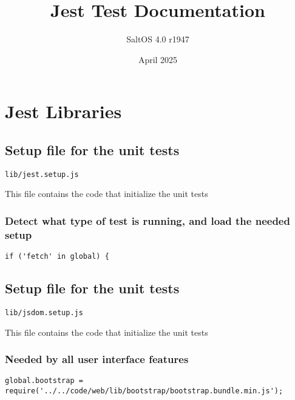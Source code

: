 \documentclass[a4paper]{article}
\title{Jest Test Documentation}
\author{SaltOS 4.0 r1947}
\begin{document}
\date{April 2025}
\maketitle
\clearpage

\tableofcontents
\clearpage


\hypertarget{toc1}{}
\section{Jest Libraries}

\hypertarget{toc2}{}
\subsection{Setup file for the unit tests}

\begin{lstlisting}
lib/jest.setup.js
\end{lstlisting}

This file contains the code that initialize the unit tests

\hypertarget{toc3}{}
\subsubsection{Detect what type of test is running, and load the needed setup}

\begin{lstlisting}
if ('fetch' in global) {
\end{lstlisting}

\hypertarget{toc4}{}
\subsection{Setup file for the unit tests}

\begin{lstlisting}
lib/jsdom.setup.js
\end{lstlisting}

This file contains the code that initialize the unit tests

\hypertarget{toc5}{}
\subsubsection{Needed by all user interface features}

\begin{lstlisting}
global.bootstrap = require('../../code/web/lib/bootstrap/bootstrap.bundle.min.js');
\end{lstlisting}
\end{document}
